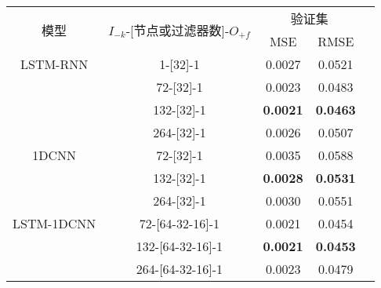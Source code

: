 \begin{table}[!htbp]
  \centering
  \label{tab:ss_area_out_1}
  \footnotesize
  \renewcommand{\arraystretch}{1}
  \begin{tabular}{ccccc}
    \toprule
    \multirow{2}{*}{模型} & \multirow{2}{*}{$I_{-k}$-[节点或过滤器数]-$O_{+f}$} & \multicolumn{2}{c}{验证集}\\
    \cmidrule(lr){3-4}
    \noalign{\smallskip}
    & & MSE & RMSE\\
    \midrule 
    LSTM-RNN & 1-[32]-1 & 0.0027 & 0.0521 \\
     & 72-[32]-1 & 0.0023 & 0.0483 \\
     & 132-[32]-1 & \textbf{0.0021} & \textbf{0.0463} \\
     & 264-[32]-1 & 0.0026 & 0.0507 \\
    \hline
    1DCNN & 72-[32]-1 & 0.0035 & 0.0588 \\
     & 132-[32]-1 & \textbf{0.0028} & \textbf{0.0531} \\
     & 264-[32]-1 & 0.0030 & 0.0551 \\
    \hline
    LSTM-1DCNN & 72-[64-32-16]-1 & 0.0021 & 0.0454 \\
     & 132-[64-32-16]-1 & \textbf{0.0021} & \textbf{0.0453} \\
     & 264-[64-32-16]-1 & 0.0023 & 0.0479 \\
    \bottomrule
\end{tabular}
\end{table}


